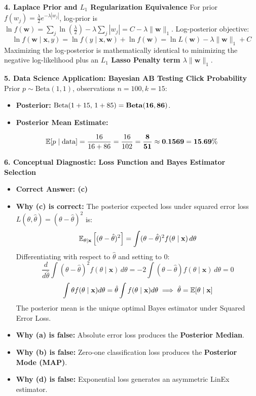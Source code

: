 \textbf{4. Laplace Prior and $L_1$ Regularization Equivalence}
For prior $f(w_j) = \frac{\lambda}{2} e^{-\lambda |w_j|}$, log-prior is $\ln f(\mathbf{w}) = \sum_{j} \ln\left(\frac{\lambda}{2}\right) - \lambda \sum_{j} |w_j| = C - \lambda \|\mathbf{w}\|_1$.
Log-posterior objective:
$$\ln f(\mathbf{w} \mid \mathbf{x}, y) = \ln f(y \mid \mathbf{x}, \mathbf{w}) + \ln f(\mathbf{w}) = \ln L(\mathbf{w}) - \lambda \|\mathbf{w}\|_1 + C$$
Maximizing the log-posterior is mathematically identical to minimizing the negative log-likelihood plus an \textbf{$L_1$ Lasso Penalty term $\lambda \|\mathbf{w}\|_1$}.

\textbf{5. Data Science Application: Bayesian AB Testing Click Probability}
Prior $p \sim \text{Beta}(1, 1)$, observations $n = 100, k = 15$:
\begin{itemize}
    \item \textbf{Posterior:} $\text{Beta}(1 + 15, \, 1 + 85) = \mathbf{\text{\textbf{Beta}}(16, 86)}$.
    \item \textbf{Posterior Mean Estimate:}
\end{itemize}
$$\mathbb{E}[p \mid \text{data}] = \frac{16}{16 + 86} = \frac{16}{102} = \mathbf{\frac{8}{51} \approx 0.1569 = 15.69\%}$$

\textbf{6. Conceptual Diagnostic: Loss Function and Bayes Estimator Selection}
\begin{itemize}
    \item \textbf{Correct Answer: (c)}
    \item \textbf{Why (c) is correct:} The posterior expected loss under squared error loss $L(\theta, \hat{\theta}) = (\theta - \hat{\theta})^2$ is:
    $$\mathbb{E}_{\theta|\mathbf{x}}\left[(\theta - \hat{\theta})^2\right] = \int (\theta - \hat{\theta})^2 f(\theta \mid \mathbf{x}) \, d\theta$$
    Differentiating with respect to $\hat{\theta}$ and setting to 0:
    $$\frac{d}{d\hat{\theta}} \int (\theta - \hat{\theta})^2 f(\theta \mid \mathbf{x}) \, d\theta = -2 \int (\theta - \hat{\theta}) f(\theta \mid \mathbf{x}) \, d\theta = 0$$
    $$\int \theta f(\theta \mid \mathbf{x}) d\theta = \hat{\theta} \int f(\theta \mid \mathbf{x}) d\theta \implies \hat{\theta} = \mathbb{E}[\theta \mid \mathbf{x}]$$
    The posterior mean is the unique optimal Bayes estimator under Squared Error Loss.
    \item \textbf{Why (a) is false:} Absolute error loss produces the \textbf{Posterior Median}.
    \item \textbf{Why (b) is false:} Zero-one classification loss produces the \textbf{Posterior Mode (MAP)}.
    \item \textbf{Why (d) is false:} Exponential loss generates an asymmetric LinEx estimator.
\end{itemize}


